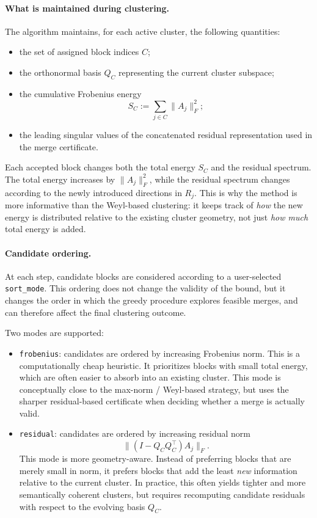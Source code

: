 \documentclass[10pt]{article} %
\begin{document}
\paragraph{What is maintained during clustering.}
The algorithm maintains, for each active cluster, the following quantities:
\begin{itemize}
  \item the set of assigned block indices $C$;
  \item the orthonormal basis $Q_C$ representing the current cluster subspace;
  \item the cumulative Frobenius energy
  \[
    S_C := \sum_{j\in C}\|A_j\|_F^2;
  \]
  \item the leading singular values of the concatenated residual representation
  used in the merge certificate.
\end{itemize}
Each accepted block changes both the total energy $S_C$ and the residual
spectrum. The total energy increases by $\|A_j\|_F^2$, while the residual
spectrum changes according to the newly introduced directions in $R_j$. This
is why the method is more informative than the Weyl-based clustering: it keeps
track of \emph{how} the new energy is distributed relative to the existing
cluster geometry, not just \emph{how much} total energy is added.

\paragraph{Candidate ordering.}
At each step, candidate blocks are considered according to a user-selected
\texttt{sort\_mode}. This ordering does not change the validity of the bound,
but it changes the order in which the greedy procedure explores feasible
merges, and can therefore affect the final clustering outcome.

Two modes are supported:
\begin{itemize}
  \item \texttt{frobenius}: candidates are ordered by increasing Frobenius norm.
  This is a computationally cheap heuristic. It prioritizes blocks with small
  total energy, which are often easier to absorb into an existing cluster.
  This mode is conceptually close to the max-norm / Weyl-based strategy, but
  uses the sharper residual-based certificate when deciding whether a merge is
  actually valid.

  \item \texttt{residual}: candidates are ordered by increasing residual norm
  \[
    \|(I - Q_C Q_C^\top)A_j\|_F.
  \]
  This mode is more geometry-aware. Instead of preferring blocks that are
  merely small in norm, it prefers blocks that add the least \emph{new}
  information relative to the current cluster. In practice, this often yields
  tighter and more semantically coherent clusters, but requires recomputing
  candidate residuals with respect to the evolving basis $Q_C$.
\end{itemize}
\end{document}
